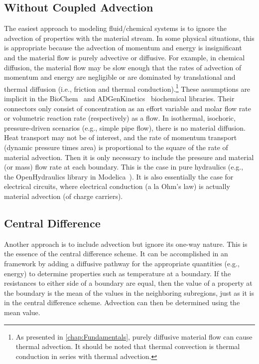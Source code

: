 

\subsection{Without Coupled Advection}


The easiest approach to modeling fluid\slash{}chemical systems is to ignore the advection of properties with the material stream.  In some physical situations, this is appropriate because the advection of momentum and energy is insignificant and the material flow is purely advective or diffusive.  For example, in chemical diffusion, the material flow may be slow enough that the rates of advection of momentum and energy are negligible or are dominated by translational and thermal diffusion (i.e., friction and thermal conduction).\footnote{As presented in \autoref{chap:Fundamentals}, purely diffusive material flow can cause thermal advection.  It should be noted that thermal convection is thermal conduction in series with thermal advection.}  These assumptions are implicit in the BioChem~\cite{Nilsson2003, Nilsson2005} and ADGenKinetics~\cite{Elsheikh2012} biochemical libraries.  Their connectors only consist of concentration as an effort variable and molar flow rate or volumetric reaction rate (respectively) as a flow.  In isothermal, isochoric, pressure-driven scenarios (e.g., simple pipe flow), there is no material diffusion.  Heat transport may not be of interest, and the rate of momentum transport (dynamic pressure times area) is proportional to the square of the rate of material advection.  Then it is only necessary to include the pressure and material (or mass) flow rate at each boundary.  This is the case in pure hydraulics (e.g., the OpenHydraulics library in Modelica~\cite{Paredis2008}).  It is also essentially the case for electrical circuits, where electrical conduction (a la Ohm's law) is actually material advection (of charge carriers).  %


\subsection{Central Difference}

Another approach is to include advection but ignore its one-way nature.  This is the essence of the central difference scheme.  It can be accomplished in an  framework by adding a diffusive pathway for the appropriate quantities (e.g., energy) to determine properties such as temperature at a boundary.  If the resistances to either side of a boundary are equal, then the value of a property at the boundary is the mean of the values in the neighboring subregions, just as it is in the central difference scheme.  Advection can then be determined using the mean value.

